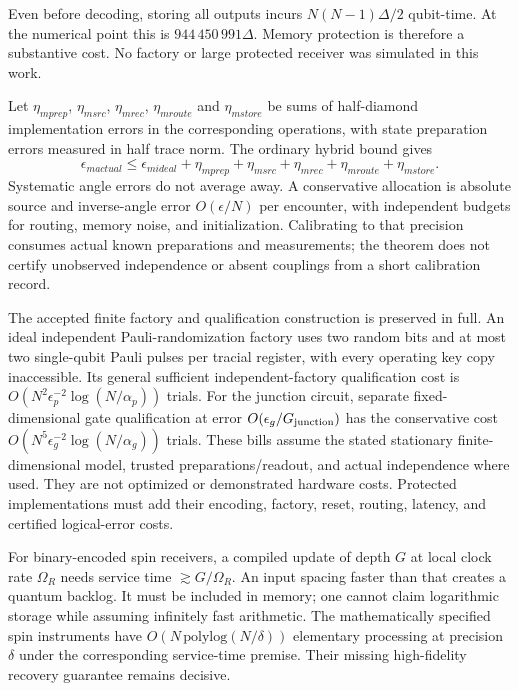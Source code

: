 \documentclass[11pt]{article}
\begin{document}
Even before decoding, storing all outputs incurs
$N(N-1)\Delta/2$ qubit-time. At the numerical point this is
$944\,450\,991\Delta$. Memory protection is therefore a substantive cost.
No factory or large protected receiver was simulated in this work.

Let $\eta_{
m prep}$, $\eta_{
m src}$, $\eta_{
m rec}$,
$\eta_{
m route}$ and $\eta_{
m store}$ be sums of half-diamond
implementation errors in the corresponding operations, with state
preparation errors measured in half trace norm. The ordinary hybrid bound
gives
\[
 \epsilon_{
m actual}\le\epsilon_{
m ideal}
 +\eta_{
m prep}+\eta_{
m src}+\eta_{
m rec}
 +\eta_{
m route}+\eta_{
m store}.
\]
Systematic angle errors do not average away. A conservative allocation is
absolute source and inverse-angle error $O(\epsilon/N)$ per encounter,
with independent budgets for routing, memory noise, and initialization.
Calibrating to that precision consumes actual known preparations and
measurements; the theorem does not certify unobserved independence or absent
couplings from a short calibration record.

The accepted finite factory and qualification construction is preserved in
full. An ideal independent Pauli-randomization factory uses two random bits
and at most two single-qubit Pauli pulses per tracial register, with every
operating key copy inaccessible. Its general sufficient independent-factory
qualification cost is $O(N^2\epsilon_p^{-2}\log(N/\alpha_p))$ trials.
For the junction circuit, separate fixed-dimensional gate qualification at
error $O(\epsilon_g/G_{\rm junction})$ has the conservative cost
$O(N^5\epsilon_g^{-2}\log(N/\alpha_g))$ trials. These bills assume the
stated stationary finite-dimensional model, trusted preparations/readout,
and actual independence where used. They are not optimized or demonstrated
hardware costs. Protected implementations must add their encoding, factory,
reset, routing, latency, and certified logical-error costs.

For binary-encoded spin receivers, a compiled update of depth $G$ at local
clock rate $\Omega_R$ needs service time $\gtrsim G/\Omega_R$. An input
spacing faster than that creates a quantum backlog. It must be included in
memory; one cannot claim logarithmic storage while assuming infinitely fast
arithmetic. The mathematically specified spin instruments have
$O(N\,\mathrm{polylog}(N/\delta))$ elementary processing at precision
$\delta$ under the corresponding service-time premise. Their missing
high-fidelity recovery guarantee remains decisive.
\end{document}

